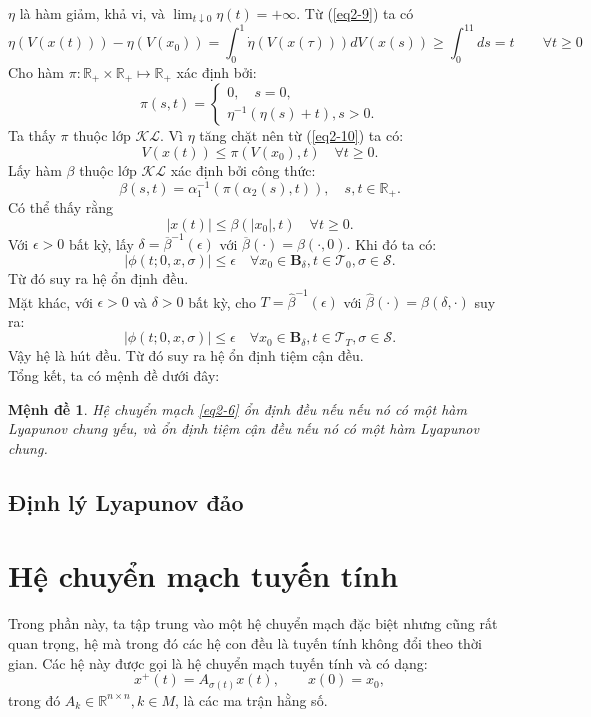 \documentclass[14pt,a4paper,oneside]{report}		%
\newtheorem{proposition}[theorem]{Mệnh đề}
\begin{document}
$\eta$ là hàm giảm, khả vi, và $\lim_{t\downarrow 0}\eta(t)=+\infty$. Từ (\ref{eq2-9}) ta có
\begin{equation} \label{eq2-10}
\eta (V(x(t))) - \eta (V(x_0)) = \int_0^1\dot{\eta}(V(x(\tau)))dV(x(s)) \geq \int_0^11ds=t\qquad\forall t\geq 0
\end{equation}
Cho hàm $\pi:\mathbb{R}_+\times\mathbb{R}_+\mapsto\mathbb{R}_+$ xác định bởi:
$$\pi(s,t)=
\begin{cases}
0, \quad s=0,\\
\eta^{-1}(\eta(s)+t), s>0.
\end{cases}$$
Ta thấy $\pi$ thuộc lớp $\mathcal{KL}$. Vì $\eta$ tăng chặt nên từ (\ref{eq2-10}) ta có:
$$V(x(t))\leq\pi(V(x_0),t)\quad\forall t\geq 0.$$
Lấy hàm $\beta$ thuộc lớp $\mathcal{KL}$ xác định bởi công thức:
$$\beta(s,t)=\alpha_1^{-1}(\pi(\alpha_2(s),t)), \quad s,t\in\mathbb{R}_+.$$
Có thể thấy rằng 
$$|x(t)|\leq\beta(|x_0|,t)\quad\forall t\geq 0.$$
Với $\epsilon>0$ bất kỳ, lấy $\delta=\overline{\beta}^{-1}(\epsilon)$ với $\overline{\beta}(\cdot)=\beta(\cdot,0).$ Khi đó ta có:
$$|\phi(t;0,x,\sigma)|\leq\epsilon\quad\forall x_0\in\mathbf{B}_\delta,t\in\mathcal{T}_0,\sigma\in\mathcal{S}.$$
Từ đó suy ra hệ ổn định đều.\\
Mặt khác, với $\epsilon >0$ và $\delta >0$ bất kỳ, cho $T=\widehat{\beta}^{-1}(\epsilon)$ với $\widehat{\beta}(\cdot)=\beta(\delta,\cdot)$ suy ra:
$$|\phi(t;0,x,\sigma)|\leq\epsilon\quad\forall x_0\in\mathbf{B}_\delta,t\in\mathcal{T}_T,\sigma\in\mathcal{S}.$$
Vậy hệ là hút đều. Từ đó suy ra hệ ổn định tiệm cận đều.\\
Tổng kết, ta có mệnh đề dưới đây:
\begin{proposition}
Hệ chuyển mạch \ref{eq2-6} ổn định đều nếu nếu nó có một hàm Lyapunov chung yếu, và ổn định tiệm cận đều nếu nó có một hàm Lyapunov chung.
\end{proposition}

\subsection{Định lý Lyapunov đảo}


\section{Hệ chuyển mạch tuyến tính}
Trong phần này, ta tập trung vào một hệ chuyển mạch đặc biệt nhưng cũng rất quan trọng, hệ mà trong đó các hệ con đều là tuyến tính không đổi theo thời gian. Các hệ này được gọi là hệ chuyển mạch tuyến tính và có dạng:
\begin{equation} \label{eq2-16}
x^+(t) = A_{\sigma (t)}x(t), \qquad x(0) = x_0,
\end{equation}
trong đó $A_k\in\mathbb{R}^{n\times n}, k\in M$, là các ma trận hằng số.\\
\end{document}
